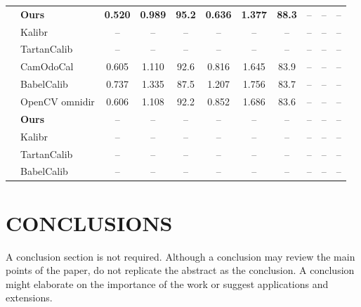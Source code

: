 \documentclass[letterpaper, 10 pt, conference]{ieeeconf}  %
\begin{document}
\begin{table}[t]
\begin{tabular*}{\textwidth}{@{\extracolsep{\fill}}clccccccccc@{}}
  & \textbf{Ours}       & \textbf{0.520} & \textbf{0.989} & \textbf{95.2} & \textbf{0.636} & \textbf{1.377} & \textbf{88.3} & -- & -- & -- \\
  & Kalibr              & -- & -- & -- & -- & -- & -- & -- & -- & -- \\
  & TartanCalib         & -- & -- & -- & -- & -- & -- & -- & -- & -- \\
  & CamOdoCal           & 0.605 & 1.110 & 92.6 & 0.816 & 1.645 & 83.9 & -- & -- & -- \\
  & BabelCalib          & 0.737 & 1.335 & 87.5 & 1.207 & 1.756 & 83.7 & -- & -- & -- \\
  & OpenCV omnidir      & 0.606 & 1.108 & 92.2 & 0.852 & 1.686 & 83.6 & -- & -- & -- \\
  \addlinespace[2pt]
  
  & \textbf{Ours}       & -- & -- & -- & -- & -- & -- & -- & -- & -- \\
  & Kalibr              & -- & -- & -- & -- & -- & -- & -- & -- & -- \\
  & TartanCalib         & -- & -- & -- & -- & -- & -- & -- & -- & -- \\
  & BabelCalib          & -- & -- & -- & -- & -- & -- & -- & -- & -- \\
  \bottomrule
  \end{tabular*}
  \end{table}  

\section{CONCLUSIONS}

A conclusion section is not required. Although a conclusion may review the main points of the paper, do not replicate the abstract as the conclusion. A conclusion might elaborate on the importance of the work or suggest applications and extensions. 

\addtolength{\textheight}{-12cm}   %
\end{document}
